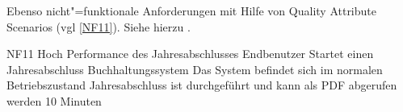Ebenso nicht"=funktionale Anforderungen mit Hilfe von Quality Attribute Scenarios (vgl \autoref{NF11}). Siehe hierzu \autocite{Barbacci2003}.

\qas %
   {NF11} %
   {Hoch} %
   {Performance des Jahresabschlusses} %
   {Endbenutzer} %
   {Startet einen Jahresabschluss} %
   {Buchhaltungssystem} %
   {Das System befindet sich im normalen Betriebszustand} %
   {Jahresabschluss ist durchgeführt und kann als PDF abgerufen werden} %
   {10 Minuten} %
